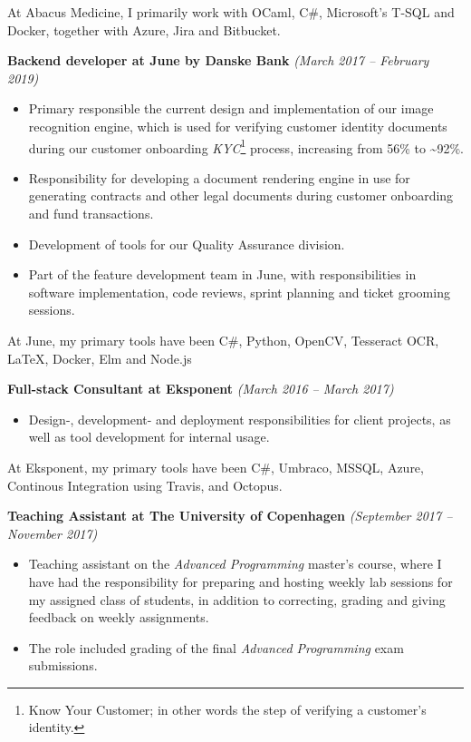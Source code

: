 \documentclass[10pt, a4paper]{article}
\begin{document}
  At Abacus Medicine, I primarily work with OCaml, C\#, Microsoft's T-SQL and
  Docker, together with Azure, Jira and Bitbucket.

\textbf{Backend developer at June by Danske Bank} \textit{(March 2017 -- February 2019)}
  \begin{itemize}[topsep=0pt]
  \item Primary responsible the current design and
  implementation of our image recognition engine, which is used for
  verifying customer identity documents during our customer onboarding
  \textit{KYC}\footnote{Know Your Customer; in other words the step of verifying a
    customer's identity.} process, increasing from 56\% to \textasciitilde 92\%.

  \item Responsibility for developing a document rendering
  engine in use for generating contracts and other legal documents
  during customer onboarding and fund transactions.

  \item Development of tools for our Quality Assurance division. 

  \item Part of the feature development team in June, with responsibilities in 
  software implementation, code reviews, sprint planning and
  ticket grooming sessions.
  \end{itemize}

  At June, my primary tools have been C\#, Python, OpenCV, Tesseract OCR, LaTeX, Docker, Elm and Node.js

\textbf{Full-stack Consultant at Eksponent} \textit{(March 2016 -- March 2017)}
\begin{itemize}[topsep=0pt]
\item 
Design-, development- and
deployment responsibilities for client projects, as well as tool development for
internal usage.
\end{itemize}
At Eksponent, my primary tools have been C\#, Umbraco, MSSQL, Azure, Continous
Integration using Travis, and Octopus.\\
  \pagebreak

\textbf{Teaching Assistant at The University of Copenhagen} \textit{(September 2017 -- November 2017)}
\begin{itemize}[topsep=0pt]
\item 
  Teaching assistant on the \textit{Advanced Programming} master's course, where
  I have had the responsibility for preparing and hosting weekly lab sessions
  for my assigned class of students, in addition to correcting, grading and
  giving feedback on weekly assignments.
\item
  The role included grading of the final \textit{Advanced Programming}
  exam submissions.
\end{itemize}
\end{document}
